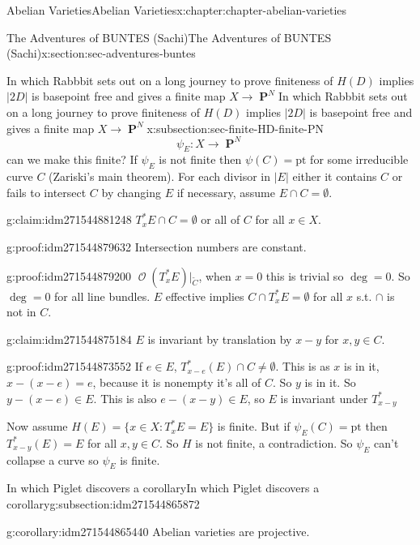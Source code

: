 \documentclass[oneside,10pt,]{book}
\numberwithin{equation}{section}
\newcommand{\sheaf}[1]{\operatorname{\mathcal{#1}}}
\DeclareMathOperator{\PP}{\mathbf{P}}
\begin{document}
\begin{chapterptx}{Abelian Varieties}{}{Abelian Varieties}{}{}{x:chapter:chapter-abelian-varieties}
\begin{sectionptx}{The Adventures of BUNTES (Sachi)}{}{The Adventures of BUNTES (Sachi)}{}{}{x:section:sec-adventures-buntes}
\begin{subsectionptx}{In which Rabbbit sets out on a long journey to prove finiteness of \(H(D)\) implies \(|2D|\) is basepoint free and gives a finite map \(X \to \PP^N\)}{}{In which Rabbbit sets out on a long journey to prove finiteness of \(H(D)\) implies \(|2D|\) is basepoint free and gives a finite map \(X \to \PP^N\)}{}{}{x:subsection:sec-finite-HD-finite-PN}
\begin{equation*}
\psi_E\colon X \to \PP^N
\end{equation*}
can we make this finite? If \(\psi_E\) is not finite then \(\psi(C) = \text{pt}\) for some irreducible curve \(C\) (Zariski's main theorem). For each divisor in \(|E|\) either it contains \(C\) or fails to intersect \(C\) by changing \(E\) if necessary, assume \(E \cap C = \emptyset\).%
\begin{claim}{}{}{g:claim:idm271544881248}%
\(T_x^*E\cap C= \emptyset\) or all of \(C\) for all \(x\in X\).%
\end{claim}
\begin{proofptx}{}{g:proof:idm271544879632}
Intersection numbers are constant.%
\end{proofptx}
\begin{proofptx}{}{g:proof:idm271544879200}
\(\sheaf O(T_x^*E)|_{\widetilde C}\), when \(x=0\) this is trivial so \(\deg =0\). So \(\deg = 0\) for all line bundles. \(E\) effective implies \(C\cap T_x^* E = \emptyset\) for all \(x\) s.t. \(\cap\) is not in \(C\).%
\end{proofptx}
\begin{claim}{}{}{g:claim:idm271544875184}%
\(E\) is invariant by translation by \(x - y\) for \(x,y \in C\).%
\end{claim}
\begin{proofptx}{}{g:proof:idm271544873552}
If \(e \in E\), \(T_{x-e}^*(E) \cap C \ne \emptyset\). This is as \(x\) is in it, \(x-(x-e) =e\), because it is nonempty it's all of \(C\). So \(y\) is in it. So \(y- (x-e) \in E\). This is also \(e - (x-y) \in E\), so \(E\) is invariant under \(T^*_{x-y}\)%
\end{proofptx}
Now assume \(H(E) = \{x\in X: T_x^*E  = E \}\) is finite. But if \(\psi_E(C) = \text{pt}\) then \(T_{x-y}^*(E)  = E\) for all \(x,y\in C\). So \(H\) is not finite, a contradiction. So \(\psi_E\) can't collapse a curve so \(\psi_E\) is finite.%
\end{subsectionptx}
%
%
\typeout{************************************************}
\typeout{************************************************}
%
\begin{subsectionptx}{In which Piglet discovers a corollary}{}{In which Piglet discovers a corollary}{}{}{g:subsection:idm271544865872}
\begin{corollary}{}{}{g:corollary:idm271544865440}%
Abelian varieties are projective.%
\end{corollary}

\end{subsectionptx}
\end{sectionptx}
\end{chapterptx}
\end{document}
